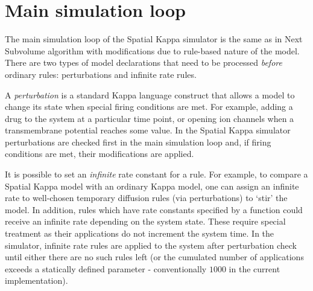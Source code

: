 \documentclass[english]{report}
\begin{document}
\section{Main simulation loop}
The main simulation loop of the Spatial Kappa simulator is the same as in Next Subvolume algorithm with modifications due to rule-based nature of the model. There are two types of model declarations that need to be processed \emph{before} ordinary rules: perturbations and infinite rate rules.

A \emph{perturbation} is a standard Kappa language construct that allows a model to change its state when special firing conditions are met. For example, adding a drug to the system at a particular time point, or opening ion channels when a transmembrane potential reaches some value. In the Spatial Kappa simulator perturbations are checked first in the main simulation loop and, if firing conditions are met, their modifications are applied.

It is possible to set an \emph{infinite} rate constant for a rule.
For example, to compare a Spatial Kappa model with an ordinary Kappa model, one can assign an infinite rate to well-chosen temporary diffusion rules (via perturbations) to `stir' the model. 
In addition, rules which have rate constants specified by a function could receive an infinite rate depending on the system state. These require special treatment as their applications do not increment the system time. In the simulator, infinite rate rules are applied to the system after perturbation check until either there are no such rules left (or the cumulated number of applications exceeds a statically defined parameter - conventionally $1000$ in the current implementation).

\end{document}

